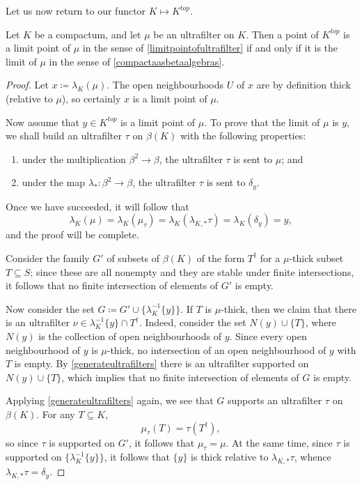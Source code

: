 Let us now return to our functor $ K \mapsto K^{\textit{top}} $.

\begin{lemma} \label{limitsarelimits}
	Let $ K $ be a compactum, and let $ \mu $ be an ultrafilter on $ K $.
	Then a point of $ K^{\textit{top}} $ is a limit point of $ \mu $ in the sense of \ref{limitpointofultrafilter} if and only if it is the limit of $ \mu $ in the sense of \ref{compactaasbetaalgebras}.
\end{lemma}

\begin{proof}
	Let $ x \coloneq \lambda_K(\mu) $.
	The open neighbourhoods $ U $ of $ x $ are by definition thick (relative to $ \mu $), so certainly $ x $ is a limit point of $ \mu $.

	Now assume that $ y \in K^{\textit{top}} $ is a limit point of $ \mu $.
	To prove that the limit of $ \mu $ is $ y $, we shall build an ultrafilter $ \tau $ on $ \beta(K) $ with the following properties:
	\begin{enumerate}
		\item under the multiplication $ \beta^2 \to \beta $, the ultrafilter $ \tau $ is sent to $ \mu $; and
		\item under the map $ \lambda_{\ast} \colon \beta^2 \to \beta  $, the ultrafilter $ \tau $ is sent to $\delta_y$.
	\end{enumerate}
	Once we have succeeded, it will follow that
	\[
		\lambda_K( \mu ) = \lambda_K( \mu_{\tau} ) = \lambda_K(\lambda_{K,\ast}\tau) = \lambda_K(\delta_y) = y \comma
	\]
	and the proof will be complete.

	Consider the family $ G' $ of subsets of $ \beta(K) $ of the form $ T^{\dag} $ for a $ \mu $-thick subset $ T \subseteq S $;
	since these are all nonempty and they are stable under finite intersections, it follows that no finite intersection of elements of $ G' $ is empty.

	Now consider the set $ G \coloneq G' \cup \{ \lambda_K^{-1}\{y\} \}$.
	If $ T $ is $ \mu $-thick, then we claim that there is an ultrafilter $ \nu \in \lambda_K^{-1}\{y\} \cap T^{\dag} $.
	Indeed, consider the set $ N(y) \cup \{T\} $, where $ N(y) $ is the collection of open neighbourhoods of $ y $.
	Since every open neighbourhood of $ y $ is $ \mu $-thick, no intersection of an open neighbourhood of $ y $ with $ T $ is empty.
	By \ref{generateultrafilters} there is an ultrafilter supported on $ N(y) \cup \{T\} $, which implies that no finite intersection of elements of $ G $ is empty.

	Applying \ref{generateultrafilters} again, we see that $ G $ supports an ultrafilter $ \tau $ on $ \beta(K) $.
	For any $ T \subseteq K $,
	\[
		\mu_{\tau}(T) = \tau(T^{\dag}) \comma
	\]
	so since $ \tau $ is supported on $ G' $, it follows that $ \mu_{\tau} = \mu $.
	At the same time, since $ \tau $ is supported on $ \{\lambda_K^{-1}\{y\}\} $, it follows that $ \{y\} $ is thick relative to $ \lambda_{K,\ast}\tau $, whence $ \lambda_{K,\ast}\tau = \delta_y $.
\end{proof}

